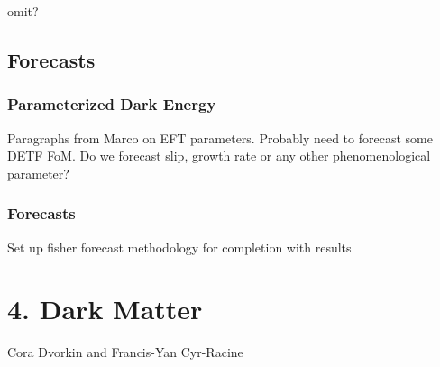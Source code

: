 \documentclass[11pt]{article}
\begin{document}
omit? 

\section{Forecasts}

\subsection{Parameterized Dark Energy}

Paragraphs from Marco on EFT parameters.   Probably need to forecast some DETF FoM.  Do we forecast slip, growth rate or any other phenomenological parameter?

\subsection{Forecasts}

Set up fisher forecast methodology for completion with results 

%


\chapter{4. Dark Matter}

Cora Dvorkin  and Francis-Yan Cyr-Racine


 
\end{document}
